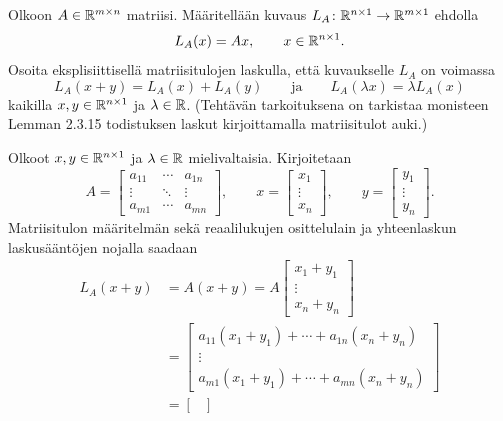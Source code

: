 \documentclass[11pt,a4paper]{amsart}
\begin{document}
\begin{exercise}
  Olkoon \(A \in \mathbb{R}^{m\times n}\) matriisi. Määritellään kuvaus
  \(L_A\colon \mathbb{R}^{n\times 1} \to \mathbb{R}^{m\times 1}\) ehdolla
  \[
    L_A(x) = Ax, \qquad x \in \mathbb{R}^{n\times 1}.
  \]
  Osoita eksplisiittisellä matriisitulojen laskulla, että kuvaukselle
  \(L_A\) on voimassa
  \[
    L_A(x+y) = L_A(x)+L_A(y)
    \qquad\text{ja}\qquad
    L_A(\lambda x) = \lambda L_A(x)
  \]
  kaikilla \(x,y \in \mathbb{R}^{n\times 1}\) ja \(\lambda \in \mathbb{R}\).
  (Tehtävän tarkoituksena on tarkistaa monisteen Lemman 2.3.15
  todistuksen laskut kirjoittamalla matriisitulot auki.)
\end{exercise}

\begin{solution}
  Olkoot \(x,y \in \mathbb{R}^{n\times 1}\) ja \(\lambda \in \mathbb{R}\)
  mielivaltaisia. Kirjoitetaan
  \[
    A =
    \begin{bmatrix}
      a_{11} & \cdots & a_{1n} \\
      \vdots & \ddots & \vdots \\
      a_{m1} & \cdots & a_{mn}
    \end{bmatrix},
    \qquad
    x =
    \begin{bmatrix} x_1 \\ \vdots \\ x_n
    \end{bmatrix},
    \qquad
    y =
    \begin{bmatrix} y_1 \\ \vdots \\ y_n
    \end{bmatrix}.
  \]
  Matriisitulon määritelmän sekä reaalilukujen osittelulain ja
  yhteenlaskun laskusääntöjen nojalla saadaan
  \[
    \begin{aligned}
      L_A(x+y)
      &= A(x+y)
      = A
      \begin{bmatrix} x_1+y_1 \\ \vdots \\ x_n+y_n
      \end{bmatrix}
      \\[1ex]
      &=
      \begin{bmatrix}
        a_{11}(x_1+y_1)+\cdots+a_{1n}(x_n+y_n) \\
        \vdots \\
        a_{m1}(x_1+y_1)+\cdots+a_{mn}(x_n+y_n)
      \end{bmatrix}
      \\[1ex]
      &=
      \begin{bmatrix}

\end{bmatrix}
\end{aligned}\]
\end{solution}
\end{document}
